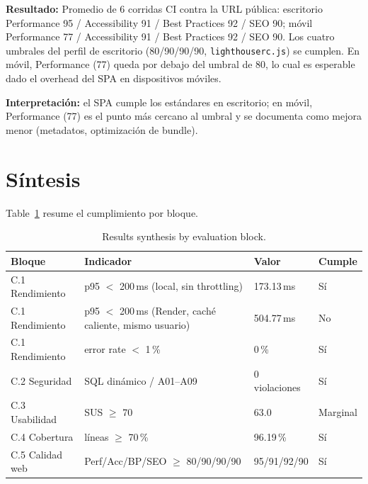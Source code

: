\textbf{Resultado:} Promedio de 6 corridas CI contra la URL pública: escritorio
Performance 95 / Accessibility 91 / Best Practices 92 / SEO 90; móvil Performance
77 / Accessibility 91 / Best Practices 92 / SEO 90. Los cuatro umbrales del
perfil de escritorio (80/90/90/90, \texttt{lighthouserc.js}) se cumplen. En móvil,
Performance (77) queda por debajo del umbral de 80, lo cual es esperable dado el
overhead del SPA en dispositivos móviles.

\textbf{Interpretación:} el SPA cumple los estándares en escritorio; en móvil,
Performance (77) es el punto más cercano al umbral y se documenta como mejora
menor (metadatos, optimización de bundle).

\section{Síntesis}
\label{sec:sintesis}

Table~\ref{tab:sintesis} resume el cumplimiento por bloque.

\begin{table}[H]
\centering
\caption{Results synthesis by evaluation block.}
\label{tab:sintesis}
\begin{tabular}{@{}llll@{}}
\toprule
Bloque & Indicador & Valor & Cumple \\
\midrule
C.1 Rendimiento & p95 $<$ 200\,ms (local, sin throttling) & 173.13\,ms & Sí \\
C.1 Rendimiento & p95 $<$ 200\,ms (Render, caché caliente, mismo usuario) & 504.77\,ms & No \\
C.1 Rendimiento & error rate $<$ 1\,\% & 0\,\% & Sí \\
C.2 Seguridad & SQL dinámico / A01--A09 & 0 violaciones & Sí \\
C.3 Usabilidad & SUS $\ge$ 70 & 63.0 & Marginal \\
C.4 Cobertura & líneas $\ge$ 70\,\% & 96.19\,\% & Sí \\
C.5 Calidad web & Perf/Acc/BP/SEO $\ge$ 80/90/90/90 & 95/91/92/90 & Sí \\
\bottomrule
\end{tabular}
\end{table}